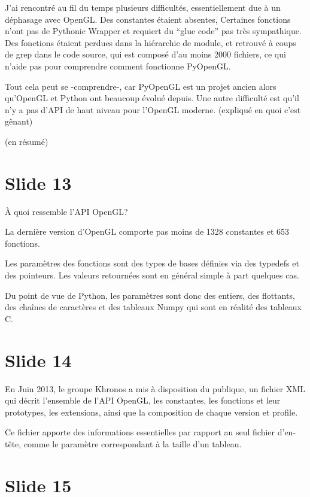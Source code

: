 \documentclass[12pt]{article}
\begin{document}
J'ai rencontré au fil du temps plusieurs difficultés, essentiellement due à un déphasage avec OpenGL.
Des constantes étaient absentes,
Certaines fonctions n'ont pas de Pythonic Wrapper et requiert du ``glue code'' pas très sympathique.
Des fonctions étaient perdues dans la hiérarchie de module, et retrouvé à coups de grep dans le code source,
qui est composé d'au moins 2000 fichiers, ce qui n'aide pas pour comprendre comment fonctionne PyOpenGL.

Tout cela peut se -comprendre-, car PyOpenGL est un projet ancien
alors qu'OpenGL et Python ont beaucoup évolué depuis.
Une autre difficulté est qu'il n'y a pas d'API de haut niveau pour l'OpenGL moderne.
(expliqué en quoi c'est gênant)

(en résumé)

\section{Slide 13}

À quoi ressemble l'API OpenGL?

La dernière version d'OpenGL comporte pas moins de 1328 constantes et 653 fonctions.

Les paramètres des fonctions sont des types de bases définies via des typedefs et des
pointeurs. Les valeurs retournées sont en général simple à part quelques cas.

Du point de vue de Python, les paramètres sont donc des entiers, des flottants, des chaînes de
caractères et des tableaux Numpy qui sont en réalité des tableaux C. %


\section{Slide 14}

En Juin 2013, le groupe Khronos a mis à disposition du publique, un fichier XML qui décrit
l'ensemble de l'API OpenGL, les constantes, les fonctions et leur prototypes, les extensions, ainsi
que la composition de chaque version et profile. %

Ce fichier apporte des informations essentielles par rapport au seul fichier d'en-tête, comme le
paramètre correspondant à la taille d'un tableau.

\section{Slide 15}
\end{document}

